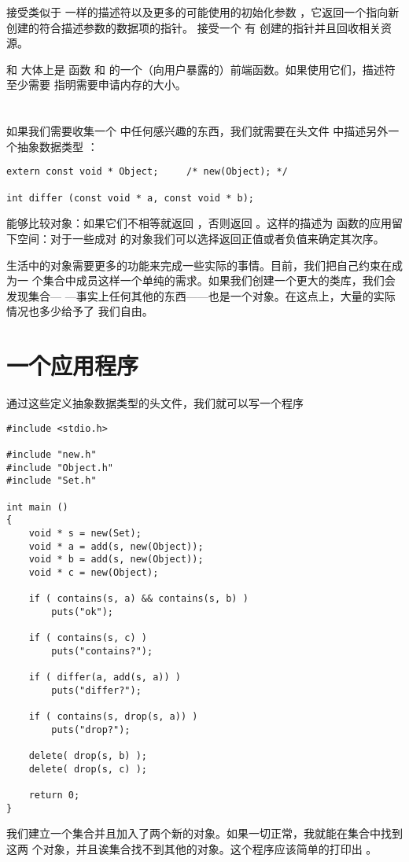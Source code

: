  接受类似于  一样的描述符以及更多的可能使用的初始化参数
，它返回一个指向新创建的符合描述参数的数据项的指针。
 接受一个
有  创建的指针并且回收相关资源。

 和  大体上是  函数 
和  的一个（向用户暴露的）前端函数。如果使用它们，描述符至少需要
指明需要申请内存的大小。

\section{\emph{}}
\label{sec:object}
如果我们需要收集一个 中任何感兴趣的东西，我们就需要在头文件
 中描述另外一个抽象数据类型 ：
\begin{lstlisting}
extern const void * Object;		/* new(Object); */

int differ (const void * a, const void * b);
\end{lstlisting}
 能够比较对象：如果它们不相等就返回 ，否则返回
。这样的描述为  函数的应用留下空间：对于一些成对
的对象我们可以选择返回正值或者负值来确定其次序。

生活中的对象需要更多的功能来完成一些实际的事情。目前，我们把自己约束在成为一
个集合中成员这样一个单纯的需求。如果我们创建一个更大的类库，我们会发现集合—
—事实上任何其他的东西——也是一个对象。在这点上，大量的实际情况也多少给予了
我们自由。

\section{一个应用程序}
\label{sec:adtApp}
通过这些定义抽象数据类型的头文件，我们就可以写一个程序 
\begin{lstlisting}
#include <stdio.h>

#include "new.h"
#include "Object.h"
#include "Set.h"

int main ()
{
	void * s = new(Set);
	void * a = add(s, new(Object));
	void * b = add(s, new(Object));
	void * c = new(Object);

	if ( contains(s, a) && contains(s, b) )
		puts("ok");

	if ( contains(s, c) )
		puts("contains?");

	if ( differ(a, add(s, a)) )
		puts("differ?");

	if ( contains(s, drop(s, a)) )
		puts("drop?");

	delete( drop(s, b) );
	delete( drop(s, c) );

	return 0;
}
\end{lstlisting}
我们建立一个集合并且加入了两个新的对象。如果一切正常，我就能在集合中找到这两
个对象，并且诶集合找不到其他的对象。这个程序应该简单的打印出 。

